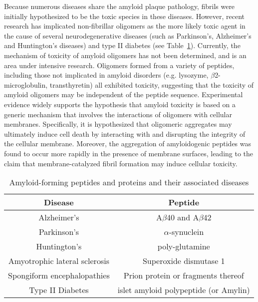 Because numerous diseases share the amyloid plaque pathology, fibrils were initially hypothesized to be the toxic species in these diseases.\cite{Hardy:2002dh} However, recent research has implicated non-fibrillar oligomers as the more likely toxic agent in the cause of several neurodegenerative diseases (such as Parkinson's, Alzheimer's and Huntington's diseases) and type II diabetes (see Table~\ref{tbl:amyloid_peptides}).\cite{Haass:2007db,Xue:2009da,Berthelot:2013fs} %
Currently, the mechanism of toxicity of amyloid oligomers has not been determined, and is an area under intensive research. Oligomers formed from a variety of peptides, including those not implicated in amyloid disorders (e.g. lysozyme, $\beta$2-microglobulin, transthyretin) all exhibited toxicity, suggesting that the toxicity of amyloid oligomers may be independent of the peptide sequence.\cite{Fandrich:2012kb,Kayed:2003en} Experimental evidence widely supports the hypothesis that amyloid toxicity is based on a generic mechanism that involves the interactions of oligomers with cellular membranes.\cite{Martins:2008bz,Walsh:2007fu} Specifically, it is hypothesized that oligomeric aggregates may ultimately induce cell death by interacting with and disrupting the integrity of the cellular membrane.\cite{Fandrich:2012kb} Moreover, the aggregation of amyloidogenic peptides was found to occur more rapidly in the presence of membrane surfaces,\cite{McLaurin:1997wm,Kayed:2004ul,Yip:2002vx} leading to the claim that membrane-catalyzed fibril formation may induce cellular toxicity.\cite{Yip:2001tl}


\begin{table}\footnotesize\centering
    \vspace{10pt}
    \caption{Amyloid-forming peptides and proteins and their associated diseases}
    \label{tbl:amyloid_peptides}
      \begin{tabular}{| c | c |}
        \hline
        Disease & Peptide \\
        \hline
        \hline
	Alzheimer's & A$\beta$40 and A$\beta$42 \\   
        \hline
	Parkinson's & $\alpha$-synuclein \\
        \hline
        Huntington's & poly-glutamine \\
        \hline
        Amyotrophic lateral sclerosis & Superoxide dismutase 1 \\
        \hline
        Spongiform encephalopathies & Prion protein or fragments thereof \\
        \hline
        Type II Diabetes & islet amyloid polypeptide (or Amylin) \\
        \hline
      \end{tabular}
    \label{tbl:amyloid_peptides}
  \end{table}

